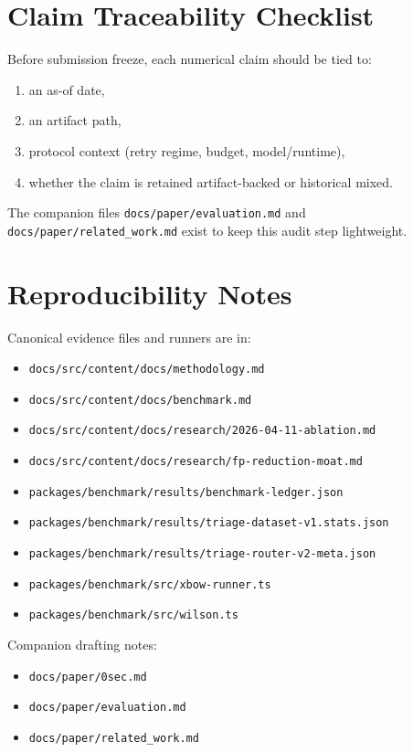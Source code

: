 \documentclass[11pt]{article}
\begin{document}
\section{Claim Traceability Checklist}

Before submission freeze, each numerical claim should be tied to:

\begin{enumerate}[leftmargin=*]
  \item an as-of date,
  \item an artifact path,
  \item protocol context (retry regime, budget, model/runtime),
  \item whether the claim is retained artifact-backed or historical mixed.
\end{enumerate}

The companion files \texttt{docs/paper/evaluation.md} and
\texttt{docs/paper/related\_work.md} exist to keep this audit step lightweight.

\section{Reproducibility Notes}

Canonical evidence files and runners are in:
\begin{itemize}
  \item \texttt{docs/src/content/docs/methodology.md}
  \item \texttt{docs/src/content/docs/benchmark.md}
  \item \texttt{docs/src/content/docs/research/2026-04-11-ablation.md}
  \item \texttt{docs/src/content/docs/research/fp-reduction-moat.md}
  \item \texttt{packages/benchmark/results/benchmark-ledger.json}
  \item \texttt{packages/benchmark/results/triage-dataset-v1.stats.json}
  \item \texttt{packages/benchmark/results/triage-router-v2-meta.json}
  \item \texttt{packages/benchmark/src/xbow-runner.ts}
  \item \texttt{packages/benchmark/src/wilson.ts}
\end{itemize}

Companion drafting notes:

\begin{itemize}
  \item \texttt{docs/paper/0sec.md}
  \item \texttt{docs/paper/evaluation.md}
  \item \texttt{docs/paper/related\_work.md}
\end{itemize}
\end{document}
